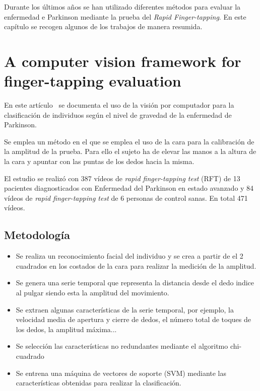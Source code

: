 
Durante los últimos años se han utilizado diferentes métodos para evaluar la enfermedad e Parkinson mediante la prueba del \textit{Rapid Finger-tapping}. En este capítulo se recogen algunos de los trabajos de manera resumida.

\section{A computer vision framework for finger-tapping evaluation}

En este artículo~\cite{khan2014computer} se documenta el uso de la visión por computador para la clasificación de individuos según el nivel de gravedad de la enfermedad de Parkinson.

Se emplea un método en el que se emplea el uso de la cara para la calibración de la amplitud de la prueba. Para ello el sujeto ha de elevar las manos a la altura de la cara y apuntar con las puntas de los dedos hacia la misma.

El estudio se realizó con 387 vídeos de \textit{rapid finger-tapping test} (RFT) de 13 pacientes diagnosticados con Enfermedad del Parkinson en estado avanzado y 84 vídeos de \textit{rapid finger-tapping test} de 6 personas de control sanas. En total 471 vídeos.

\subsection{Metodología}
\begin{itemize}
	\item Se realiza un reconocimiento facial del individuo y se crea a partir de el 2 cuadrados en los costados de la cara para realizar la medición de la amplitud.
	\item Se genera una serie temporal que representa la distancia desde el dedo indice al pulgar siendo esta la amplitud del movimiento.
	\item Se extraen algunas características de la serie temporal, por ejemplo, la velocidad media de apertura y cierre de dedos, el número total de toques de los dedos, la amplitud máxima...
	\item Se selección las características no redundantes mediante el algoritmo chi-cuadrado
	\item Se entrena una máquina de vectores de soporte (SVM) mediante las características obtenidas para realizar la clasificación.

\end{itemize}
